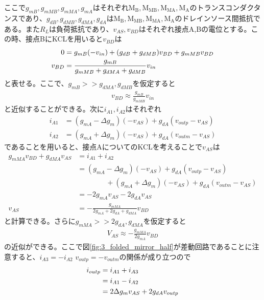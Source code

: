         \clearpage
        ここで$g_{mB},g_{mMB},g_{mMA},g_{mA}$はそれぞれ$\mathrm{M_{B},M_{MB},M_{MA},M_{A}}$のトランスコンダクタンスであり、$g_{dB},g_{dMB},g_{dMA},g_{dA}$は$\mathrm{M_{B},M_{MB},M_{MA},M_{A}}$のドレインソース間抵抗である。また$R_{L}$は負荷抵抗であり、$v_{AS},v_{BD}$はそれぞれ接点A,Bの電位とする。この時、接点BにKCLを用いると$v_{BD}$は
        \begin{align}
            0&=g_{mB}(-v_{in})+(g_{dB}+g_{dMB})v_{BD}+g_{mMB}v_{BD}     \notag\\
            v_{BD}&=\frac{g_{mB}}{ g_{mMB}+g_{dMA}+g_{dMB} }v_{in}      \notag
        \end{align}
        と表せる。ここで、$g_{mB}>>g_{dMA},g_{dMB}$を仮定すると
        \begin{align}
            v_{BD}\approx \frac{g_{mB}}{g_{mMB}}v_{in}      \label{eq:3_vbd}
        \end{align}
        と近似することができる。次に$i_{A1},i_{A2}$はそれぞれ
        \begin{align}
            i_{A1}&=(g_{mA}-\Delta g_{m})(-v_{AS})+g_{dA}(v_{outp}-v_{AS})      \label{eq:3_ia1}\\
            i_{A2}&=(g_{mA}+\Delta g_{m})(-v_{AS})+g_{dA}(v_{outm}-v_{AS})      \label{eq:3_ia2}   
        \end{align}
        であることを用いると、接点AについてのKCLを考えることで$v_{AS}$は
        \begin{align*}
            g_{mMA}v_{BD}+g_{dMA}v_{AS}&=i_{A1}+i_{A2}   \\
            &=(g_{mA}-\Delta g_{m})(-v_{AS})+g_{dA}(v_{outp}-v_{AS})    \\
            &\quad\quad\quad\quad +(g_{mA}+\Delta g_{m})(-v_{AS})+g_{dA}(v_{outm}-v_{AS})       \\
            &=-2g_{mA}v_{AS}-2g_{dA}v_{AS}  \\
            v_{AS} &= -\frac{ g_{mMA} }{ 2g_{mA}+2g_{dA}+g_{dMA} }v_{BD}
        \end{align*}
        と計算できる。さらに$g_{mMA}>>2g_{dA},g_{dMA}$を仮定すると
        \begin{align}
            V_{AS} \approx -\frac{g_{mMA}}{2g_{mA}} v_{BD}      \label{eq:3_vas}
        \end{align}
        の近似ができる。ここで図\ref{fig:3_folded_mirror_half}が差動回路であることに注意すると、\mbox{$i_{A3}=-i_{A2}$} \mbox{$v_{outp}=-v_{outm}$}の関係が成り立つので
        \begin{align}
            i_{outp}&=i_{A1}+i_{A3}     \notag\\
            &=i_{A1}-i_{A2}     \notag\\
            &=2\Delta g_{m}v_{AS}+2g_{dA}v_{outp}     \label{eq:3_ioutp}
        \end{align}
